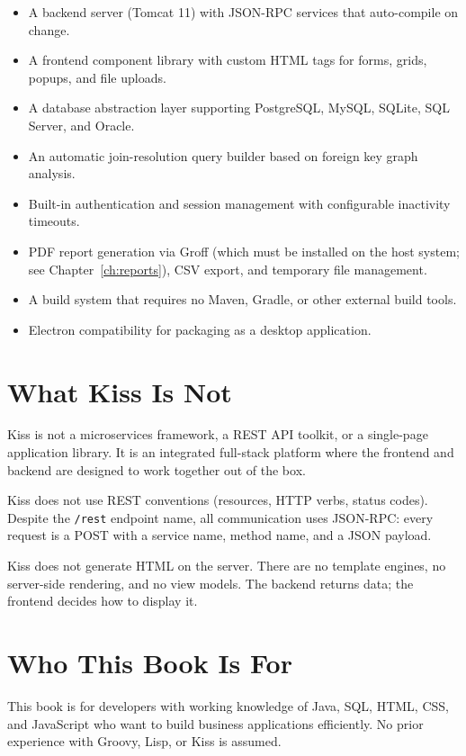 \begin{itemize}
  \item A backend server (Tomcat 11) with JSON-RPC services that auto-compile on change.
  \item A frontend component library with custom HTML tags for forms, grids, popups, and file uploads.
  \item A database abstraction layer supporting PostgreSQL, MySQL, SQLite, SQL Server, and Oracle.
  \item An automatic join-resolution query builder based on foreign key graph analysis.
  \item Built-in authentication and session management with configurable inactivity timeouts.
  \item PDF report generation via Groff (which must be installed on the host system; see Chapter~\ref{ch:reports}), CSV export, and temporary file management.
  \item A build system that requires no Maven, Gradle, or other external build tools.
  \item Electron compatibility for packaging as a desktop application.
\end{itemize}

\section{What Kiss Is Not}
\label{sec:intro-isnot}

Kiss is not a microservices framework, a REST API toolkit, or a single-page application library.  It is an integrated full-stack platform where the frontend and backend are designed to work together out of the box.

Kiss does not use REST conventions (resources, HTTP verbs, status codes).  Despite the \texttt{/rest} endpoint name, all communication uses JSON-RPC: every request is a POST with a service name, method name, and a JSON payload.

Kiss does not generate HTML on the server.  There are no template engines, no server-side rendering, and no view models.  The backend returns data; the frontend decides how to display it.

\section{Who This Book Is For}
\label{sec:intro-audience}

This book is for developers with working knowledge of Java, SQL, HTML, CSS, and JavaScript who want to build business applications efficiently.  No prior experience with Groovy, Lisp, or Kiss is assumed.

